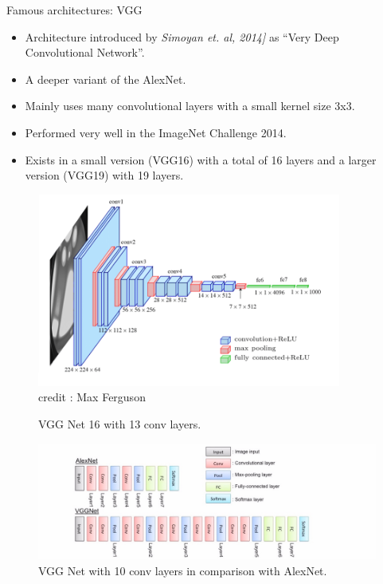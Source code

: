 \begin{vbframe}{Famous architectures: VGG}
  \begin{itemize}
    \item Architecture introduced by \textit{Simoyan et. al, 2014]} as \enquote{Very Deep Convolutional Network}.
    \item A deeper variant of the AlexNet.
    \item Mainly uses many convolutional layers with a small kernel size 3x3.
    \item Performed very well in the ImageNet Challenge 2014.
    \item Exists in a small version (VGG16) with a total of 16 layers and a larger version (VGG19) with 19 layers.
  \end{itemize}
\framebreak
  \begin{figure}
  \centering
    \includegraphics[width=10cm]{plots/architectures/vgg_16n.png}
    \tiny{\\ credit : Max Ferguson}
    \caption{VGG Net 16 with 13 conv layers.}
  \end{figure}
\framebreak
  \begin{figure}
  \centering
    \includegraphics[width=13cm]{plots/architectures/vgg.png}
    \caption{VGG Net with 10 conv layers in comparison with AlexNet.}
  \end{figure}
\end{vbframe}
